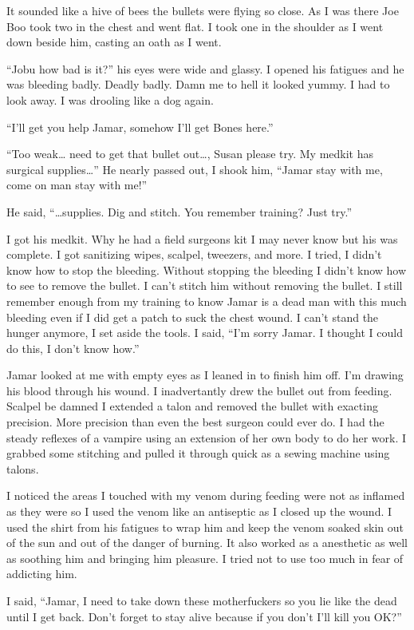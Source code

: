 It sounded like a hive of bees the bullets were flying so close. As I was there Joe Boo took two in the chest and went flat. I took one in the shoulder as I went down beside him, casting an oath as I went.

``Jobu how bad is it?'' his eyes were wide and glassy. I opened his fatigues and he was bleeding badly. Deadly badly. Damn me to hell it looked yummy. I had to look away. I was drooling like a dog again.

``I'll get you help Jamar, somehow I'll get Bones here.''

``Too weak\dots{} need to get that bullet out\dots{}, Susan please try. My medkit has surgical supplies\dots{}'' He nearly passed out, I shook him, ``Jamar stay with me, come on man stay with me!''

He said, ``\dots{}supplies. Dig and stitch. You remember training? Just try.''

I got his medkit. Why he had a field surgeons kit I may never know but his was complete. I got sanitizing wipes, scalpel, tweezers, and more. I tried, I didn't know how to stop the bleeding. Without stopping the bleeding I didn't know how to see to remove the bullet. I can't stitch him without removing the bullet. I still remember enough from my training to know Jamar is a dead man with this much bleeding even if I did get a patch to suck the chest wound. I can't stand the hunger anymore, I set aside the tools. I said, ``I'm sorry Jamar. I thought I could do this, I don't know how.''

Jamar looked at me with empty eyes as I leaned in to finish him off. I'm drawing his blood through his wound. I inadvertantly drew the bullet out from feeding. Scalpel be damned I extended a talon and removed the bullet with exacting precision. More precision than even the best surgeon could ever do. I had the steady reflexes of a vampire using an extension of her own body to do her work. I grabbed some stitching and pulled it through quick as a sewing machine using talons.

I noticed the areas I touched with my venom during feeding were not as inflamed as they were so I used the venom like an antiseptic as I closed up the wound. I used the shirt from his fatigues to wrap him and keep the venom soaked skin out of the sun and out of the danger of burning. It also worked as a anesthetic as well as soothing him and bringing him pleasure. I tried not to use too much in fear of addicting him.

I said, ``Jamar, I need to take down these motherfuckers so you lie like the dead until I get back. Don't forget to stay alive because if you don't I'll kill you OK?''

